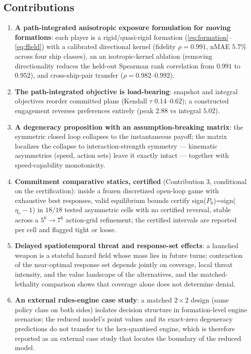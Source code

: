 \documentclass[12pt,a4paper]{article}
\newcommand{\etar}{\eta_r}
\begin{document}
\subsection{Contributions}
\begin{enumerate}
\item \textbf{A path-integrated anisotropic exposure formulation for moving
formations}: each player is a rigid/quasi-rigid formation
(\eqref{eq:formation}--\eqref{eq:ffield}) with a calibrated directional
kernel (fidelity $\rho=0.991$, nMAE $5.7\%$ across four ship classes), an
an isotropic-kernel ablation (removing directionality reduces the
held-out Spearman rank correlation from $0.991$ to $0.952$), and
cross-ship-pair transfer ($\rho=0.982$--$0.992$).
\item \textbf{The path-integrated objective is load-bearing}: snapshot and
integral objectives reorder committed plans (Kendall $\tau$ $0.14$--$0.62$);
a constructed engagement reverses preferences entirely (peak $2.88$ vs
integral $5.02$).
\item \textbf{A degeneracy proposition with an assumption-breaking matrix}:
the symmetric closed loop collapses to the instantaneous payoff; the matrix
localizes the collapse to interaction-strength symmetry --- kinematic
asymmetries (speed, action sets) leave it exactly intact --- together with
speed-capability monotonicity.
\item \textbf{Commitment comparative statics, certified} (Contribution 3,
conditional on the certification): inside a frozen discretized open-loop
game with exhaustive best responses, valid equilibrium bounds certify
sign($P_6$)=sign($\etar-1$) in $18/18$ tested asymmetric cells with no
certified reversal, stable across a $5^6\to7^6$ action-grid refinement;
the certified intervals are reported per cell and flagged tight or loose.
\item \textbf{Delayed spatiotemporal threat and response-set effects}: a
launched weapon is a stateful hazard field whose mass lies in future turns;
contraction of the near-optimal response set depends jointly on coverage,
local threat intensity, and the value landscape of the alternatives, and the
matched-lethality comparison shows that coverage alone does not determine
denial.
\item \textbf{An external rules-engine case study}: a matched $2\times2$
design (same policy class on both sides) isolates decision structure in
formation-level engine scenarios; the reduced model's point values and its
exact-zero degeneracy predictions do not transfer to the hex-quantised
engine, which is therefore reported as an external case study that locates
the boundary of the reduced model.
\end{enumerate}
\end{document}

